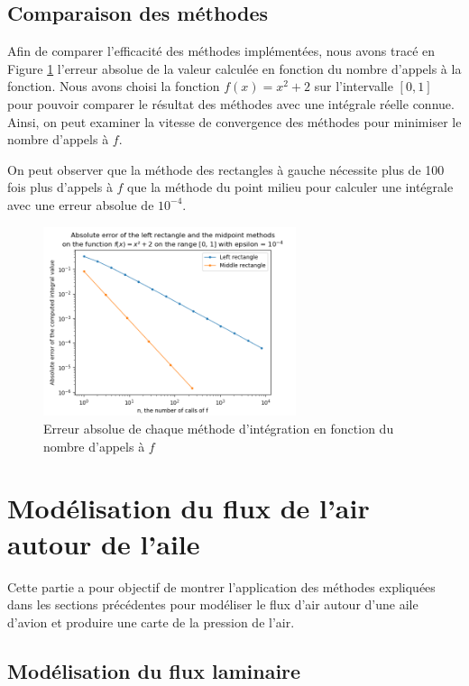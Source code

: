 \documentclass{article}
\begin{document}
\subsection{Comparaison des méthodes}

Afin de comparer l'efficacité des méthodes implémentées, nous avons tracé en Figure \ref{erreur_abs} l'erreur absolue de la valeur calculée en fonction du nombre d'appels à la fonction. Nous avons choisi la fonction $f(x) = x^2 + 2$ sur l'intervalle $[0, 1]$ pour pouvoir comparer le résultat des méthodes avec une intégrale réelle connue. Ainsi, on peut examiner la vitesse de convergence des méthodes pour minimiser le nombre d'appels à $f$.

On peut observer que la méthode des rectangles à gauche nécessite plus de 100 fois plus d'appels à $f$ que la méthode du point milieu pour calculer une intégrale avec une erreur absolue de $10^{-4}$.

\begin{figure}[!htb]
    \centering
    \includegraphics[width=0.66\textwidth]{error_integration_plot.png}
    \caption{Erreur absolue de chaque méthode d'intégration en fonction du nombre d'appels à $f$}
    \label{erreur_abs}
\end{figure}

\section{Modélisation du flux de l'air autour de l'aile}

Cette partie a pour objectif de montrer l'application des méthodes expliquées dans les sections précédentes pour modéliser le flux d'air autour d'une aile d'avion et produire une carte de la pression de l'air.

\subsection{Modélisation du flux laminaire}
\end{document}
